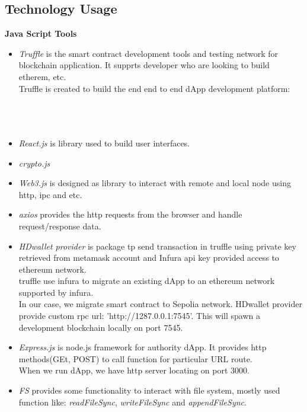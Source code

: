 \subsection{Technology Usage}

\textbf{Java Script Tools} \\
\begin{itemize}
 \item \textit{Truffle} is the smart contract development tools and testing network for blockchain application. It supprts developer who are looking to build etherem, etc. \\
Truffle is created to build the end end to end dApp development platform: \\
\hspace{3cm} \\
\hspace{3cm} \\
\hspace{3cm} \\
\item \textit{React.js} is library used to build user interfaces.\\
\item \textit{crypto.js} \\
\item \textit{Web3.js} is designed as library to interact with remote and local node using http, ipc and etc.\\
\item \textit{axios} provides the http requests from the browser and handle request/response data. \\
\item \textit{HDwallet provider} is package tp send transaction in truffle using private key retrieved from metamask account and Infura api key provided access to ethereum network. \\
truffle use infura to migrate an existing dApp to an ethereum network supported by infura.\\
In our case, we migrate smart contract to Sepolia network.
HDwallet provider provide custom rpc url: 'http://1287.0.0.1:7545'. This will spawn a development blockchain locally on port 7545. \\
\item \textit{Express.js} is node.js framework for authority dApp. It provides http methods(GEt, POST) to call function for particular URL route. \\ 
When we run dApp, we have http server locating on port 3000. \\
\item \textit{FS} provides some functionality to interact with file system, mostly used function like: \textit{readFileSync}, \textit{writeFileSync} and \textit{appendFileSync}. \\
\end{itemize}

